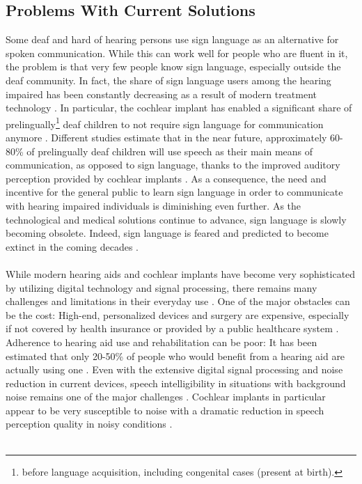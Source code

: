 \documentclass[english, 12pt, a4paper, pdftex, elec, utf8]{aaltothesis}
\begin{document}
\subsection{Problems With Current Solutions}

Some deaf and hard of hearing persons use sign language as an alternative for spoken communication. While this can work well for people who are fluent in it, the problem is that very few people know sign language, especially outside the deaf community. In fact, the share of sign language users among the hearing impaired has been constantly decreasing as a result of modern treatment technology \cite{stacey2006hearing, raino2012sisakorvaistutteen}. In particular, the cochlear implant has enabled a significant share of prelingually\footnote{before language acquisition, including congenital cases (present at birth).} deaf children to not require sign language for communication anymore \cite{moore2007cochlear, peterson2010cochlear}. Different studies estimate that in the near future, approximately 60-80\% of prelingually deaf children will use speech as their main means of communication, as opposed to sign language, thanks to the improved auditory perception provided by cochlear implants \cite{raino2012sisakorvaistutteen}. As a consequence, the need and incentive for the general public to learn sign language in order to communicate with hearing impaired individuals is diminishing even further. As the technological and medical solutions continue to advance, sign language is slowly becoming obsolete. Indeed, sign language is feared and predicted to become extinct in the coming decades \cite{raino2012sisakorvaistutteen}. \\\\
While modern hearing aids and cochlear implants have become very sophisticated by utilizing digital technology and signal processing, there remains many challenges and limitations in their everyday use \cite{levitt2007historical}. One of the major obstacles can be the cost: High-end, personalized devices and surgery are expensive, especially if not covered by health insurance or provided by a public healthcare system \cite{wilson2017global}. Adherence to hearing aid use and rehabilitation can be poor: It has been estimated that only 20-50\% of people who would benefit from a hearing aid are actually using one \cite{koskela2013kuulokojeen}. Even with the extensive digital signal processing and noise reduction in current devices, speech intelligibility in situations with background noise remains one of the major challenges \cite{healy2016difficulty, levitt2007historical, goehring2016speech}. Cochlear implants in particular appear to be very susceptible to noise with a dramatic reduction in speech perception quality in noisy conditions \cite{ healy2016difficulty, friesen2001speech, fu2005noise, srinivasan2013improving}. \\\\
\end{document}

